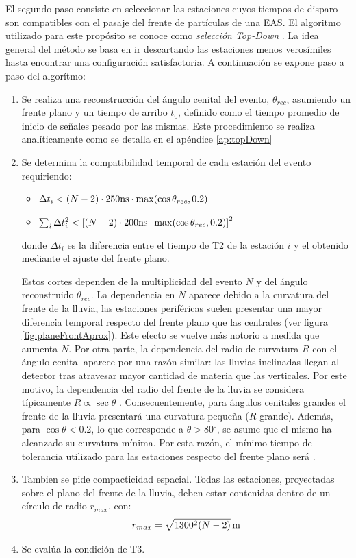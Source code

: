 	El segundo paso consiste en seleccionar las estaciones cuyos tiempos de disparo son compatibles con el pasaje del frente de part\'iculas de una EAS.
	El algoritmo utilizado para este propósito se conoce como \emph{selección Top-Down} \cite{topDownSel}.
	La idea general del método se basa en ir descartando las estaciones menos veros\'imiles hasta encontrar una configuración satisfactoria.
	A continuación se expone paso a paso del algorítmo:
	\begin{enumerate}
	 \item Se realiza una reconstrucción del ángulo cenital del evento, $\theta_{rec}$, asumiendo un frente plano y un tiempo de arribo $t_0$, definido como el tiempo promedio de inicio de señales pesado por las mismas. Este procedimiento se realiza anal\'iticamente como se detalla en el apéndice \ref{ap:topDown}
	 \item Se determina la compatibilidad temporal de cada estación del evento requiriendo:
	 \begin{itemize}
	  \item $\Delta t_i < (N-2)\cdot 250{\rm ns} \cdot {\rm max}(\cos\theta_{rec},0.2)$
	  \item $\sum_i\Delta t_i^2 < \left[(N-2)\cdot 200{\rm ns} \cdot {\rm max}(\cos\theta_{rec},0.2)\right]^2$
	 \end{itemize}
	 donde $\Delta t_i$ es la diferencia entre el tiempo de T2 de la estaci\'on $i$ y el obtenido mediante el ajuste del frente plano.
	 
	 Estos cortes dependen de la multiplicidad del evento $N$ y del ángulo reconstruido $\theta_{rec}$.
	 La dependencia en $N$ aparece debido a la curvatura del frente de la lluvia, las estaciones periféricas suelen presentar una mayor diferencia temporal respecto del frente plano que las centrales (ver figura \ref{fig:planeFrontAprox}).
	 Este efecto se vuelve m\'as notorio a medida que aumenta $N$.
	 Por otra parte, la dependencia del radio de curvatura $R$ con el ángulo cenital aparece por una razón similar: las lluvias inclinadas llegan al detector tras atravesar mayor cantidad de materia que las verticales. Por este motivo, la dependencia del radio del frente de la lluvia se considera típicamente $R\propto\sec\theta$ \cite{cite:ShowerFront}.
	 Consecuentemente, para ángulos cenitales grandes el frente de la lluvia presentar\'a una curvatura pequeña ($R$ grande).
	 Adem\'as, para $\cos\theta < 0.2$, lo que corresponde a $\theta>80^\circ$, se asume que el mismo ha alcanzado su curvatura mínima.
	 Por esta raz\'on, el mínimo tiempo de tolerancia utilizado para las estaciones respecto del frente plano será .
	 \item Tambien se pide compacticidad espacial.
	 Todas las estaciones, proyectadas sobre el plano del frente de la lluvia, deben estar contenidas dentro de un círculo de radio $r_{max}$, con:
	 \begin{equation}
	  r_{max} = \sqrt{1300^2(N-2)}\,{\rm m}
	 \end{equation}
	 \item Se eval\'ua la condición de T3.
	\end{enumerate}

